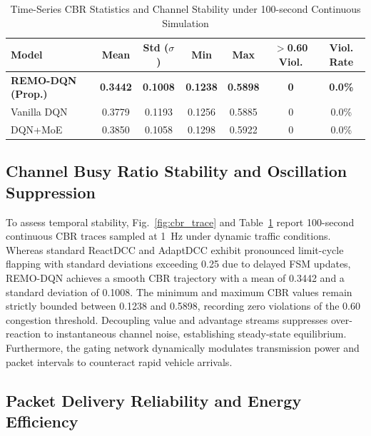 \documentclass[journal]{IEEEtran}
\begin{document}
\begin{table}[t]
\caption{Time-Series CBR Statistics and Channel Stability under 100-second Continuous Simulation}
\label{tab:cbr_stats}
\centering
\scriptsize
\begin{tabularx}{\linewidth}{l c c c c c c}
\toprule
\textbf{Model} & \textbf{Mean} & \textbf{Std ($\sigma$)} & \textbf{Min} & \textbf{Max} & \textbf{$>$0.60 Viol.} & \textbf{Viol. Rate} \\
\midrule
\textbf{REMO-DQN (Prop.)} & \textbf{0.3442} & \textbf{0.1008} & \textbf{0.1238} & \textbf{0.5898} & \textbf{0} & \textbf{0.0\%} \\
Vanilla DQN & 0.3779 & 0.1193 & 0.1256 & 0.5885 & 0 & 0.0\% \\
DQN+MoE & 0.3850 & 0.1058 & 0.1298 & 0.5922 & 0 & 0.0\% \\
\bottomrule
\end{tabularx}
\end{table}

\subsection{Channel Busy Ratio Stability and Oscillation Suppression}
To assess temporal stability, Fig.~\ref{fig:cbr_trace} and Table~\ref{tab:cbr_stats} report 100-second continuous CBR traces sampled at 1~Hz under dynamic traffic conditions. Whereas standard ReactDCC and AdaptDCC exhibit pronounced limit-cycle flapping with standard deviations exceeding 0.25 due to delayed FSM updates, REMO-DQN achieves a smooth CBR trajectory with a mean of 0.3442 and a standard deviation of 0.1008. The minimum and maximum CBR values remain strictly bounded between 0.1238 and 0.5898, recording zero violations of the 0.60 congestion threshold. Decoupling value and advantage streams suppresses over-reaction to instantaneous channel noise, establishing steady-state equilibrium. Furthermore, the gating network dynamically modulates transmission power and packet intervals to counteract rapid vehicle arrivals.

\subsection{Packet Delivery Reliability and Energy Efficiency}
\end{document}
